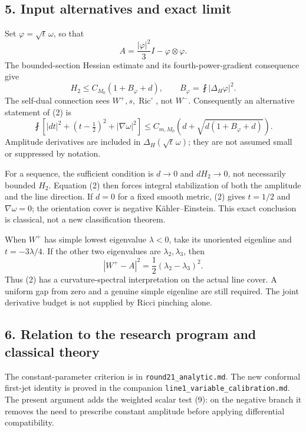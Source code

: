 \documentclass[
  11pt,
]{article}
\begin{document}
\hypertarget{input-alternatives-and-exact-limit}{%
\subsection{5. Input alternatives and exact
limit}\label{input-alternatives-and-exact-limit}}

Set \(\varphi=\sqrt t\,\omega\), so that \[
 A=\frac{|\varphi|^2}{3}I-\varphi\otimes\varphi.
\] The bounded-section Hessian estimate and its fourth-power-gradient
consequence give \[
 H_2\le C_{M_0}(1+B_\varphi+d),\qquad
 B_\varphi=\fint|\Delta_H\varphi|^2.
\tag{15}
\] The self-dual connection sees \(W^+,s,\operatorname{Ric}^{\circ}\),
not \(W^-\). Consequently an alternative statement of (2) is \[
 \fint\left[|dt|^2+(t-\tfrac12)^2+|\nabla\omega|^2\right]
 \le C_{m,M_0}\left(d+\sqrt{d(1+B_\varphi+d)}\right).
\tag{16}
\] Amplitude derivatives are included in \(\Delta_H(\sqrt t\,\omega)\);
they are not assumed small or suppressed by notation.

For a sequence, the sufficient condition is \(d\to0\) and \(dH_2\to0\),
not necessarily bounded \(H_2\). Equation (2) then forces integral
stabilization of both the amplitude and the line direction. If \(d=0\)
for a fixed smooth metric, (2) gives \(t=1/2\) and \(\nabla\omega=0\);
the orientation cover is negative Kähler--Einstein. This exact
conclusion is classical, not a new classification theorem.

When \(W^+\) has simple lowest eigenvalue \(\lambda<0\), take its
unoriented eigenline and \(t=-3\lambda/4\). If the other two eigenvalues
are \(\lambda_2,\lambda_3\), then \[
 |W^+-A|^2=\frac12(\lambda_2-\lambda_3)^2.
\tag{17}
\] Thus (2) has a curvature-spectral interpretation on the actual line
cover. A uniform gap from zero and a genuine simple eigenline are still
required. The joint derivative budget is not supplied by Ricci pinching
alone.

\hypertarget{relation-to-the-research-program-and-classical-theory}{%
\subsection{6. Relation to the research program and classical
theory}\label{relation-to-the-research-program-and-classical-theory}}

The constant-parameter criterion is in \texttt{round21\_analytic.md}.
The new conformal first-jet identity is proved in the companion
\texttt{line1\_variable\_calibration.md}. The present argument adds the
weighted scalar test (9): on the negative branch it removes the need to
prescribe constant amplitude before applying differential compatibility.
\end{document}
